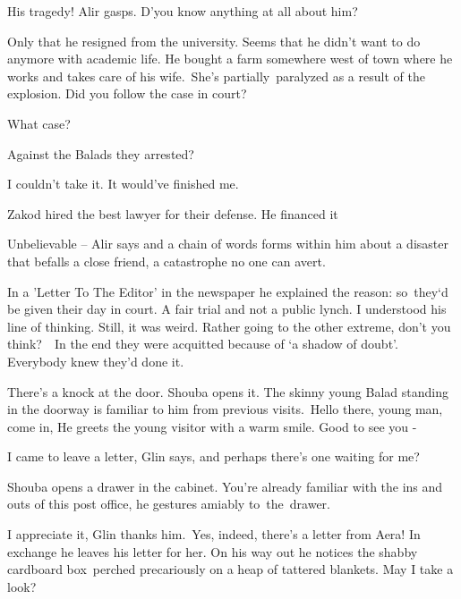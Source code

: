 \documentclass[twoside,11pt]{book}
\begin{document}
{\textquotedbl}His tragedy!{\textquotedbl} Alir gasps. {\textquotedbl}D'you know anything at all about
him?{\textquotedbl} 

{\textquotedbl}Only that he resigned from the university. Seems that he didn't want to do anymore with academic life. He
bought a farm somewhere west of town where he works and takes care of his wife.\ She's partially\ paralyzed as a result
of the explosion. Did you follow the case in court?{\textquotedbl} 

{\textquotedbl}What case?{\textquotedbl} 

{\textquotedbl}Against the Balads they arrested?{\textquotedbl} 

{\textquotedbl}I couldn't take it. It would've finished me.{\textquotedbl} 

{\textquotedbl}Zakod hired the best lawyer for their defense. He financed it

{\textquotedbl}Unbelievable --{\textquotedbl} Alir says and a chain of words forms within him about a disaster that
befalls a close friend, a catastrophe no one can avert.

{\textquotedbl}In a {}'Letter To The Editor{}' in the newspaper he explained the reason: so\ they`d be given their day
in court. A fair trial and not a public lynch. I understood his line of thinking. Still, it was weird. Rather going to
the other extreme, don't you think?{\ \ }In the end they were acquitted because
of `a shadow of doubt'. Everybody knew they'd done it.{\textquotedbl}

There's a knock at the door. Shouba opens it. The skinny young Balad standing in the doorway is familiar to him from
previous visits.\ {\textquotedbl}Hello there, young man, come in,{\textquotedbl} He greets the young visitor with a
warm smile. {\textquotedbl}Good to see you -{\textquotedbl} 

{\textquotedbl}I came to leave a letter,{\textquotedbl} Glin says, {\textquotedbl}and perhaps there's one waiting for
me?{\textquotedbl}

Shouba opens a drawer in the cabinet. {\textquotedbl}You're already familiar with the ins and outs of this post
office,{\textquotedbl} he gestures amiably to~the~drawer.

{\textquotedbl}I appreciate it,{\textquotedbl} Glin thanks him.\ Yes, indeed, there's a letter from Aera! In exchange he
leaves his letter for her. On his way out he notices the shabby cardboard box\ perched precariously on a heap of
tattered blankets. {\textquotedbl}May I take a look?{\textquotedbl} \ 
\end{document}
